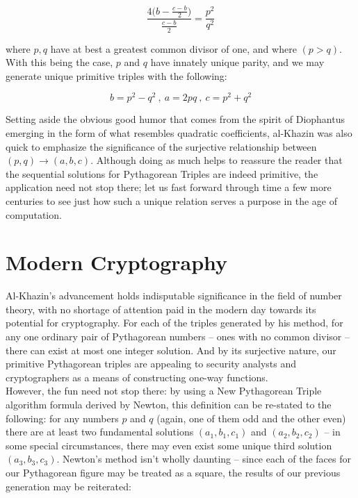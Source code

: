 \documentclass{article}
\begin{document}
$$ \frac{4 \Big( b - \frac{c-b}{2} \Big)}{\frac{c-b}{2}}  = \frac{p^2}{q^2} $$

where $p,q$ have at best a greatest common divisor of one, and where $(p >q)$. \\

With this being the case, $p$ and $q$ have innately unique parity, and we may generate unique primitive triples with the following:

$$ b = p^2 - q^2 \ , \ a = 2pq \ ,\ c = p^2 + q^2 $$

Setting aside the obvious good humor that comes from the spirit of Diophantus emerging in the form of what resembles quadratic coefficients, al-Khazin was also quick to emphasize the significance of the surjective relationship between $(p,q) \longrightarrow (a,b,c)$. \cite{Rashed} Although doing as much helps to reassure the reader that the sequential solutions for Pythagorean Triples are indeed primitive, the application need not stop there; let us fast forward through time a few more centuries to see just how such a unique relation serves a purpose in the age of computation. \\

\section{Modern Cryptography}

Al-Khazin's advancement holds indisputable significance in the field of number theory, with no shortage of attention paid in the modern day towards its potential for cryptography. For each of the triples generated by his method, for any one ordinary pair of Pythagorean numbers – ones with no common divisor – there can exist at most one integer solution. And by its surjective nature, our primitive Pythagorean triples are appealing to security analysts and cryptographers as a means of constructing one-way functions. \\

However, the fun need not stop there: by using a New Pythagorean Triple algorithm formula derived by Newton, \cite{dataencryption} this definition can be re-stated to the following: for any numbers $p$ and $q$ (again, one of them odd and the other even) there are at least two fundamental solutions $(a_1,b_1,c_1)$ and $ (a_2,b_2,c_2) $ -- in some special circumstances, there may even exist some unique third solution $(a_3,b_3,c_3)$. \cite{pythagoreancrypto} Newton's method isn't wholly daunting -- since each of the faces for our Pythagorean figure may be treated as a square, the results of our previous generation may be reiterated: 
\end{document}
